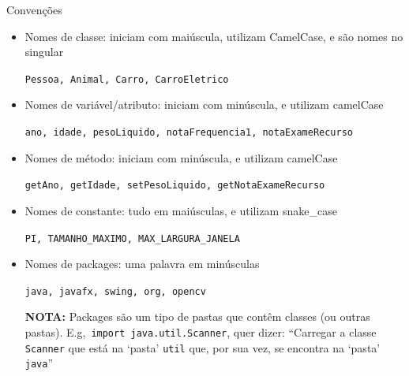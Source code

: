\documentclass[portuguese, aspectratio=169, xcolor=table]{beamer}
\begin{document}
\begin{frame}{Convenções}
\begin{itemize}
        \item Nomes de classe: iniciam com maiúscula, utilizam CamelCase, e são nomes no singular

\hspace{0.25cm}\texttt{Pessoa, Animal, Carro, CarroEletrico}

    \item Nomes de variável/atributo: iniciam com minúscula, e utilizam camelCase

    \hspace{0.25cm}\texttt{ano, idade, pesoLiquido, notaFrequencia1, notaExameRecurso}

    \item Nomes de método: iniciam com minúscula, e utilizam camelCase

        \hspace{0.25cm}\texttt{getAno, getIdade, setPesoLiquido, getNotaExameRecurso}

    \item Nomes de constante: tudo em maiúsculas, e utilizam snake\_case

        \hspace{0.25cm}\texttt{PI, TAMANHO\_MAXIMO, MAX\_LARGURA\_JANELA}
\item Nomes de packages: uma palavra em minúsculas

\hspace{0.25cm}\texttt{java, javafx, swing, org, opencv}
\vspace{0.15cm}

\scriptsize \textbf{NOTA:} Packages são um tipo de pastas que contêm classes (ou outras pastas). E.g,\ \texttt{import java.util.Scanner}, quer dizer: ``Carregar a classe \texttt{Scanner} que está na `pasta' \texttt{util} que, por sua vez, se encontra na `pasta' \texttt{java}''
\end{itemize}
\end{frame}
\end{document}
